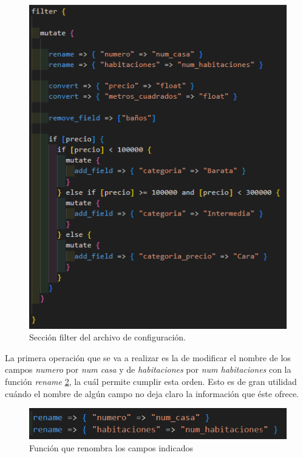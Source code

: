 \begin{figure}
    \centering
    \includegraphics[width=1\linewidth]{img/filter.png}
    \caption{Sección filter del archivo de configuración.}
    \label{fig:filter}
\end{figure}

La primera operación que se va a realizar es la de modificar el nombre de los campos \textit{numero} por \textit{num casa} y de \textit{habitaciones} por \textit{num habitaciones} con la función \textit{rename} \ref{fig:rename}, la cuál permite cumplir esta orden. Esto es de gran utilidad cuándo el nombre de algún campo no deja claro la información que éste ofrece.

\begin{figure}
    \centering
    \includegraphics[width=1\linewidth]{img/rename.png}
    \caption{Función que renombra los campos indicados}
    \label{fig:rename}
\end{figure}

